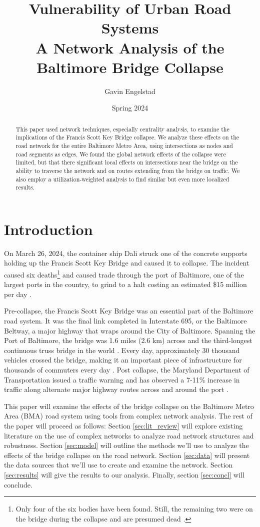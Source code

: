 \documentclass[11pt]{article}
\title{Vulnerability of Urban Road Systems \\ %
    \large A Network Analysis of the Baltimore Bridge Collapse}
\author{Gavin Engelstad}
\date{Spring 2024}
\numberwithin{equation}{section} %
\numberwithin{figure}{section} %
\numberwithin{table}{section} %
\theoremstyle{definition}
\begin{document}
\maketitle

\begin{abstract}
  This paper used network techniques, especially centrality analysis, to examine the implications of the Francis Scott Key Bridge collapse. We analyze these effects on the road network for the entire Baltimore Metro Area, using intersections as nodes and road segments as edges. We found the global network effects of the collapse were limited, but that there significant local effects on intersections near the bridge on the ability to traverse the network and on routes extending from the bridge on traffic. We also employ a utilization-weighted analysis to find similar but even more localized results.
\end{abstract}

\section{Introduction}

On March 26, 2024, the container ship Dali struck one of the concrete supports holding up the Francis Scott Key Bridge and caused it to collapse. The incident caused six deaths\footnote{Only four of the six bodies have been found. Still, the remaining two were on the bridge during the collapse and are presumed dead \parencite{Hassan24}.} and caused trade through the port of Baltimore, one of the largest ports in the country, to grind to a halt costing an estimated \$15 million per day \parencites{Hassan24}{AlJazeera24}.

Pre-collapse, the Francis Scott Key Bridge was an essential part of the Baltimore road system. It was the final link completed in Interstate 695, or the Baltimore Beltway, a major highway that wraps around the City of Baltimore. Spanning the Port of Baltimore, the bridge was 1.6 miles (2.6 km) across and the third-longest continuous truss bridge in the world \parencite{Parry24}. Every day, approximately 30 thousand vehicles crossed the bridge, making it an important piece of infrastructure for thousands of commuters every day \parencite{MDOT24}. Post collapse, the Maryland Department of Transportation issued a traffic warning and has observed a 7-11\% increase in traffic along alternate major highway routes across and around the port \parencites{MDOT24}{Domen24}.

This paper will examine the effects of the bridge collapse on the Baltimore Metro Area (BMA) road system using tools from complex network analysis. The rest of the paper will proceed as follows: Section \ref{sec:lit_review} will explore existing literature on the use of complex networks to analyze road network structures and robustness. Section \ref{sec:model} will outline the methods we'll use to analyze the effects of the bridge collapse on the road network. Section \ref{sec:data} will present the data sources that we'll use to create and examine the network. Section \ref{sec:results} will give the results to our analysis. Finally, section \ref{sec:concl} will conclude.
\end{document}
